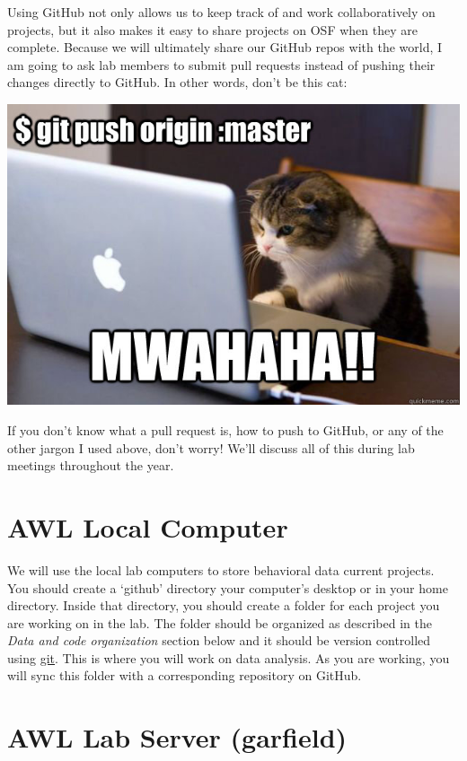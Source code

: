 \documentclass[
]{book}
\begin{document}
Using GitHub not only allows us to keep track of and work collaboratively on projects, but it also makes it easy to share projects on OSF when they are complete. Because we will ultimately share our GitHub repos with the world, I am going to ask lab members to submit pull requests instead of pushing their changes directly to GitHub. In other words, don't be this cat:

\includegraphics{images/github.png}

If you don't know what a pull request is, how to push to GitHub, or any of the other jargon I used above, don't worry! We'll discuss all of this during lab meetings throughout the year.

\hypertarget{awl-local-computer}{%
\section{AWL Local Computer}\label{awl-local-computer}}

We will use the local lab computers to store behavioral data current projects. You should create a `github' directory your computer's desktop or in your home directory. Inside that directory, you should create a folder for each project you are working on in the lab. The folder should be organized as described in the \emph{Data and code organization} section below and it should be version controlled using \href{https://git-scm.com/}{git}. This is where you will work on data analysis. As you are working, you will sync this folder with a corresponding repository on GitHub.

\hypertarget{awl-lab-server-garfield}{%
\section{AWL Lab Server (garfield)}\label{awl-lab-server-garfield}}
\end{document}
